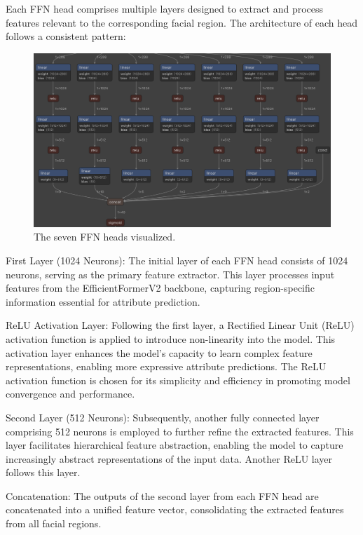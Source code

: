 \documentclass[a4paper,oneside]{article}
\begin{document}
Each FFN head comprises multiple layers designed to extract and process features relevant to the corresponding facial region.
The architecture of each head follows a consistent pattern:

\begin{figure}[h]
  \includegraphics[width=\textwidth]{ModelHead.png}
  \centering
  \caption{The seven FFN heads visualized.}
  \centering
  \end{figure}

First Layer (1024 Neurons): The initial layer of each FFN head consists of 1024 neurons, serving as the primary feature extractor.
This layer processes input features from the EfficientFormerV2 backbone, capturing region-specific information essential for attribute prediction.

ReLU Activation Layer: Following the first layer, a Rectified Linear Unit (ReLU) \citet{DBLP:journals/corr/abs-1803-08375} activation function is applied to introduce non-linearity into the model.
This activation layer enhances the model's capacity to learn complex feature representations, enabling more expressive attribute predictions.
The ReLU activation function is chosen for its simplicity and efficiency in promoting model convergence and performance.

Second Layer (512 Neurons): Subsequently, another fully connected layer comprising 512 neurons is employed to further refine the extracted features.
This layer facilitates hierarchical feature abstraction, enabling the model to capture increasingly abstract representations of the input data.
Another ReLU layer follows this layer.

Concatenation: The outputs of the second layer from each FFN head are concatenated into a unified feature vector, consolidating the extracted features from all facial regions.
\end{document}
